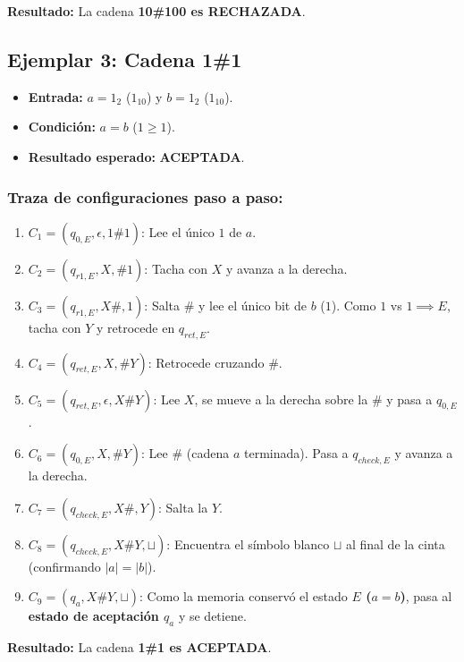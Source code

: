 \vspace{0.2cm}
\noindent\textbf{Resultado:} La cadena \textbf{10\#100 es RECHAZADA}.

\subsection*{Ejemplar 3: Cadena 1\#1}

\begin{itemize}[leftmargin=*]
    \item \textbf{Entrada:} $a = 1_2$ ($1_{10}$) y $b = 1_2$ ($1_{10}$).
    \item \textbf{Condición:} $a = b$ ($1 \ge 1$).
    \item \textbf{Resultado esperado:} \textbf{ACEPTADA}.
\end{itemize}

\subsubsection*{Traza de configuraciones paso a paso:}

\begin{enumerate}[label=\arabic*., leftmargin=*]
    \item $C_1 = (q_{0,E}, \epsilon, 1\#1)$: Lee el único $1$ de $a$.
    \item $C_2 = (q_{r1,E}, X, \#1)$: Tacha con $X$ y avanza a la derecha.
    \item $C_3 = (q_{r1,E}, X\#, 1)$: Salta $\#$ y lee el único bit de $b$ ($1$). Como $1$ vs $1 \implies E$, tacha con $Y$ y retrocede en $q_{ret,E}$.
    \item $C_4 = (q_{ret,E}, X, \#Y)$: Retrocede cruzando $\#$.
    \item $C_5 = (q_{ret,E}, \epsilon, X\#Y)$: Lee $X$, se mueve a la derecha sobre la $\#$ y pasa a $q_{0,E}$.
    \item $C_6 = (q_{0,E}, X, \#Y)$: Lee $\#$ (cadena $a$ terminada). Pasa a $q_{check,E}$ y avanza a la derecha.
    \item $C_7 = (q_{check,E}, X\#, Y)$: Salta la $Y$.
    \item $C_8 = (q_{check,E}, X\#Y, \sqcup)$: Encuentra el símbolo blanco $\sqcup$ al final de la cinta (confirmando $|a| = |b|$).
    \item $C_9 = (q_a, X\#Y, \sqcup)$: Como la memoria conservó el estado \textbf{$E$ ($a = b$)}, pasa al \textbf{estado de aceptación $q_a$} y se detiene.
\end{enumerate}

\vspace{0.2cm}
\noindent\textbf{Resultado:} La cadena \textbf{1\#1 es ACEPTADA}.